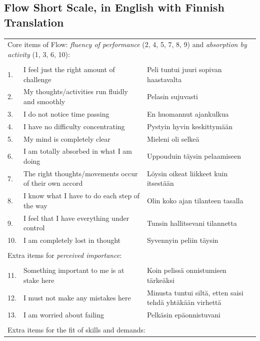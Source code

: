 \documentclass{article}
\begin{document}
\subsection*{Flow Short Scale, in English with Finnish Translation}

\begin{minipage}{\textwidth}
\begin{tabular}{l p{} p{}}
\multicolumn{3}{l}{Core items of Flow: {\it fluency of performance} (2, 4, 5, 7, 8, 9) and {\it absorption by activity} (1, 3, 6, 10):} \\
\\
1. & I feel just the right amount of challenge    &    Peli tuntui juuri sopivan haastavalta  \\
2. & My thoughts/activities run fluidly and smoothly   & Pelasin sujuvasti \\
3. & I do not notice time passing  & En huomannut ajankulkua \\
4. & I have no difficulty concentrating & Pystyin hyvin keskittym\"{a}\"{a}n \\
5. & My mind is completely clear & Mieleni oli selke\"{a} \\
6. & I am totally absorbed in what I am doing & Uppouduin t\"{a}ysin pelaamiseen \\
7. & The right thoughts/movements occur of their own accord & L\"{o}ysin oikeat liikkeet kuin itsest\"{a}\"{a}n \\
8. & I know what I have to do each step of the way & Olin koko ajan tilanteen tasalla \\
9. & I feel that I have everything under control & Tunsin hallitsevani tilannetta \\
10. & I am completely lost in thought & Syvennyin peliin t\"{a}ysin  \\
\\
\multicolumn{3}{l}{Extra items for {\it perceived importance}:} \\
\\
11. & Something important to me is at stake here & Koin peliss\"{a} onnistumisen t\"{a}rke\"{a}ksi \\
12. & I must not make any mistakes here & Minusta tuntui silt\"{a}, etten saisi tehd\"{a} yht\"{a}k\"{a}\"{a}n virhett\"{a}\\
13. & I am worried about failing & Pelk\"{a}sin ep\"{a}onnistuvani\\
\\
\multicolumn{3}{l}{Extra items for the fit of skills and demands:} \\

\end{tabular}
\end{minipage}
\end{document}
